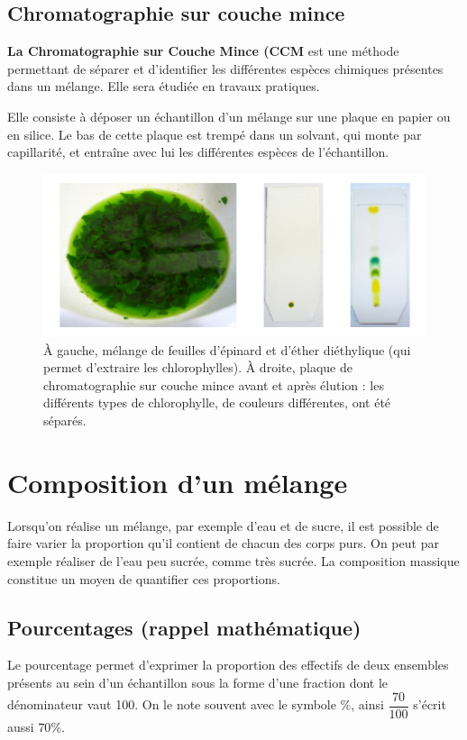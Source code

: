\documentclass[french, a4paper, 12pt, twocolumn, landscape]{article}
\begin{document}
		\subsection{Chromatographie sur couche mince}

		\textbf{La Chromatographie sur Couche Mince (CCM} est une méthode permettant de séparer et d'identifier les différentes espèces chimiques présentes dans un mélange. Elle sera étudiée en travaux pratiques.\medskip
		
		Elle consiste à déposer un échantillon d'un mélange sur une plaque en papier ou en silice. Le bas de cette plaque est trempé dans un solvant, qui monte par capillarité, et entraîne avec lui les différentes espèces de l'échantillon.

		\begin{figure}[ht]
			\centering
			\includegraphics[width=.5\textwidth]{ccm.png}
			\caption{À gauche, mélange de feuilles d’épinard et d’éther diéthylique (qui permet
			d’extraire les chlorophylles). À droite, plaque de chromatographie sur couche mince
			avant et après élution : les différents types de chlorophylle, de couleurs différentes,
			ont été séparés.}
		\end{figure}
		\section{Composition d'un mélange}

		Lorsqu'on réalise un mélange, par exemple d'eau et de sucre, il est possible de faire varier la proportion qu'il contient de chacun des corps purs. On peut par exemple réaliser de l'eau peu sucrée, comme très sucrée. La composition massique constitue un moyen de quantifier ces proportions. 
		\vspace{-.5cm}
		\subsection{Pourcentages (rappel mathématique)}

		Le pourcentage permet d'exprimer la proportion des effectifs de deux ensembles présents au sein d'un échantillon sous la forme d'une fraction dont le dénominateur vaut 100. On le note souvent avec le symbole \og{}$\%$\fg{}, ainsi \og{}$\dfrac{70}{100}$\fg{} s'écrit aussi \og{}$70\%$\fg{}.
\end{document}
